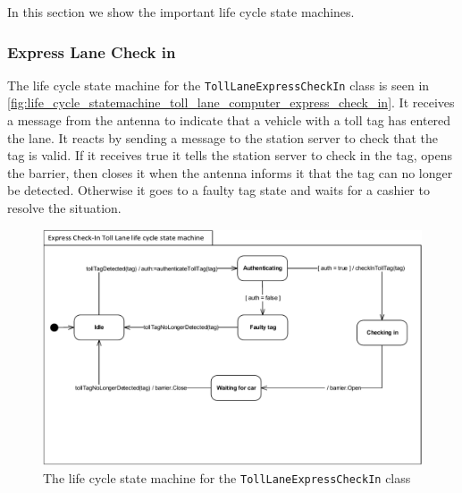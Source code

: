 In this section we show the important life cycle state machines.
\subsubsection*{Express Lane Check in}
The life cycle state machine for the \texttt{TollLaneExpressCheckIn} class is seen in \autoref{fig:life_cycle_statemachine_toll_lane_computer_express_check_in}. It receives a message from the antenna to indicate that a vehicle with a toll tag has entered the lane. It reacts by sending a message to the station server to check that the tag is valid. If it receives true it tells the station server to check in the tag, opens the barrier, then closes it when the antenna informs it that the tag can no longer be detected.  Otherwise it goes to a faulty tag state and waits for a cashier to resolve the situation. 
\begin{figure}[H]
\centering
\includegraphics[width=0.7\linewidth]{img/behaviour_state_machines/life_cycle_state_machines/life_cycle_statemachine_toll_lane_computer_express_check_in}
\caption{The life cycle state machine for the \texttt{TollLaneExpressCheckIn} class}
\label{fig:life_cycle_statemachine_toll_lane_computer_express_check_in}
\end{figure}

